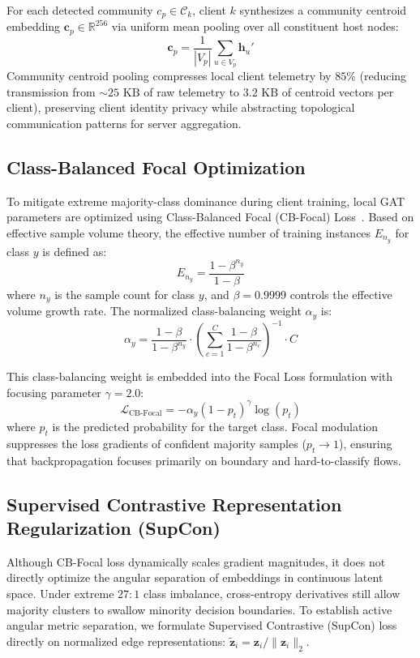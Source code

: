 \documentclass[12pt,a4paper]{report}
\begin{document}
For each detected community $c_p \in \mathcal{C}_k$, client $k$ synthesizes a community centroid embedding $\boldsymbol{c}_p \in \mathbb{R}^{256}$ via uniform mean pooling over all constituent host nodes:
\begin{equation}
\boldsymbol{c}_p = \frac{1}{|V_p|} \sum_{u \in V_p} \boldsymbol{h}_u'
\label{eq:centroid_pool}
\end{equation}
Community centroid pooling compresses local client telemetry by $85\%$ (reducing transmission from $\sim 25\text{ KB}$ of raw telemetry to $3.2\text{ KB}$ of centroid vectors per client), preserving client identity privacy while abstracting topological communication patterns for server aggregation.

\subsection{Class-Balanced Focal Optimization}
To mitigate extreme majority-class dominance during client training, local GAT parameters are optimized using Class-Balanced Focal (CB-Focal) Loss~\cite{cui2019cbloss, lin2017focal}. Based on effective sample volume theory, the effective number of training instances $E_{n_y}$ for class $y$ is defined as:
\begin{equation}
E_{n_y} = \frac{1 - \beta^{n_y}}{1 - \beta}
\label{eq:eff_samples}
\end{equation}
where $n_y$ is the sample count for class $y$, and $\beta = 0.9999$ controls the effective volume growth rate. The normalized class-balancing weight $\alpha_y$ is:
\begin{equation}
\alpha_y = \frac{1 - \beta}{1 - \beta^{n_y}} \cdot \left( \sum_{c=1}^C \frac{1 - \beta}{1 - \beta^{n_c}} \right)^{-1} \cdot C
\label{eq:cb_weights_def}
\end{equation}

This class-balancing weight is embedded into the Focal Loss formulation with focusing parameter $\gamma = 2.0$:
\begin{equation}
\mathcal{L}_{\text{CB-Focal}} = - \alpha_y (1 - p_t)^\gamma \log(p_t)
\label{eq:cb_focal_eq}
\end{equation}
where $p_t$ is the predicted probability for the target class. Focal modulation suppresses the loss gradients of confident majority samples ($p_t \to 1$), ensuring that backpropagation focuses primarily on boundary and hard-to-classify flows.

\subsection{Supervised Contrastive Representation Regularization (SupCon)}
Although CB-Focal loss dynamically scales gradient magnitudes, it does not directly optimize the angular separation of embeddings in continuous latent space. Under extreme $27:1$ class imbalance, cross-entropy derivatives still allow majority clusters to swallow minority decision boundaries. To establish active angular metric separation, we formulate Supervised Contrastive (SupCon) loss~\cite{khosla2020supcon} directly on normalized edge representations: $\tilde{\boldsymbol{z}}_i = \boldsymbol{z}_i / \|\boldsymbol{z}_i\|_2$.
\end{document}
